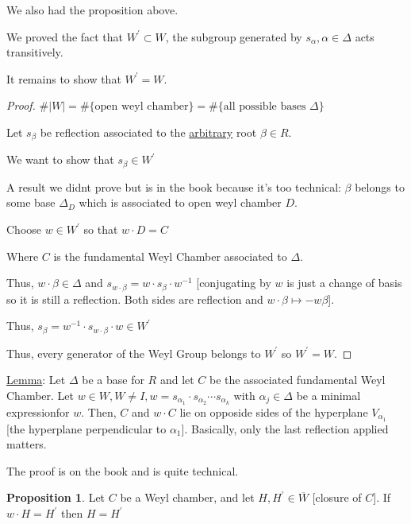 \documentclass{article}
\theoremstyle{definition}
\newtheorem{proposition}{Proposition}
\begin{document}
We also had the proposition above.

We proved the fact that \(W^{\prime} \subset W\), the subgroup generated by \(s_\alpha, \alpha \in \Delta\) acts transitively.

It remains to show that \(W^{\prime} = W\).

\begin{proof}
    
    \(\#|W| = \#\{ \text{open weyl chamber}  \} = \#\{ \text{all possible bases } \Delta \}  \) 

    Let \(s_\beta \) be reflection associated to the \underline{arbitrary} root \(\beta\in R\).

    We want to show that \(s_\beta \in W^{\prime}\) 

    A result we didnt prove but is in the book because it's too technical: \(\beta\) belongs to some base \(\Delta_D\) which is associated to open weyl chamber \(D\).

    Choose \(w\in W^{\prime}\) so that \(w\cdot D = C\)

    Where \(C\) is the fundamental Weyl Chamber associated to \(\Delta\).

    Thus, \(w\cdot \beta \in \Delta\) and \(s_{w\cdot \beta} = w\cdot s_\beta \cdot w^{-1}\) [conjugating by \(w\) is just a change of basis so it is still a reflection. Both sides are reflection and \(w\cdot \beta \mapsto -w \beta\)].

    Thus, \(s_\beta = w^{-1} \cdot s_{w\cdot \beta}\cdot w \in W^{\prime}\) 

    Thus, every generator of the Weyl Group belongs to \(W^{\prime}\) so \(W^{\prime} = W\).

\end{proof}

\underline{Lemma}: Let \(\Delta \) be a base for \(R\) and let \(C\) be the associated fundamental Weyl Chamber. Let \(w\in W, W\neq I, w = s_{\alpha_1}\cdot s_{\alpha_2}\cdots s_{\alpha _k}\) with \(\alpha_j \in \Delta\) be a minimal expressionfor \(w\). Then, \(C\) and \(w\cdot C\) lie on opposide sides of the hyperplane \(V_{\alpha_1}\) [the hyperplane perpendicular to \(\alpha_1\)]. Basically, only the last reflection applied matters.

The proof is on the book and is quite technical.

\begin{proposition}
    Let \(C\) be a Weyl chamber, and let \(H,H^{\prime} \in \overline{W} \) [closure of \(C\)]. If \(w\cdot H = H^{\prime} \) then \(H = H^{\prime} \) 
\end{proposition}
\end{document}
